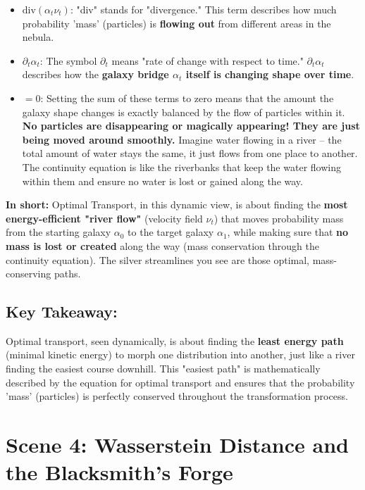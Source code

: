 \documentclass{article}
\begin{document}
\begin{itemize}
        \begin{itemize}
            \item \textbf{\( \text{div}(\alpha_t \nu_t) \)}:  "div" stands for "divergence."  This term describes how much probability 'mass' (particles) is \textbf{flowing out} from different areas in the nebula.
            \item \textbf{\( \partial_t \alpha_t \)}: The symbol \( \partial_t \) means "rate of change with respect to time."  \( \partial_t \alpha_t \) describes how the \textbf{galaxy bridge \( \alpha_t \) itself is changing shape over time}.
            \item \textbf{\( = 0 \)}:  Setting the sum of these terms to zero means that the amount the galaxy shape changes is exactly balanced by the flow of particles within it.  \textbf{No particles are disappearing or magically appearing!  They are just being moved around smoothly.}  Imagine water flowing in a river – the total amount of water stays the same, it just flows from one place to another.  The continuity equation is like the riverbanks that keep the water flowing within them and ensure no water is lost or gained along the way.
        \end{itemize}
\end{itemize}


\textbf{In short:} Optimal Transport, in this dynamic view, is about finding the \textbf{most energy-efficient "river flow"} (velocity field \( \nu_t \)) that moves probability mass from the starting galaxy \( \alpha_0 \) to the target galaxy \( \alpha_1 \), while making sure that \textbf{no mass is lost or created} along the way (mass conservation through the continuity equation). The silver streamlines you see are those optimal, mass-conserving paths.

\subsection*{Key Takeaway:}

Optimal transport, seen dynamically, is about finding the \textbf{least energy path} (minimal kinetic energy) to morph one distribution into another, just like a river finding the easiest course downhill. This "easiest path" is mathematically described by the equation for optimal transport and ensures that the probability 'mass' (particles) is perfectly conserved throughout the transformation process.

\hrulefill

\section*{Scene 4: Wasserstein Distance and the Blacksmith's Forge}
\end{document}

